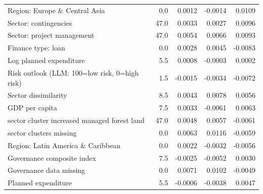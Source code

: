\begin{table}[t]
\begin{tabular}{p{6cm}rrrr}
Region: Europe \& Central Asia & 0.0 & 0.0012 & -0.0014 & 0.0109 \\[2pt]
Sector: contingencies & 47.0 & 0.0033 & 0.0027 & 0.0096 \\[2pt]
Sector: project management & 47.0 & 0.0054 & 0.0066 & 0.0093 \\[2pt]
Finance type: loan & 0.0 & 0.0028 & 0.0045 & -0.0083 \\[2pt]
Log planned expenditure & 5.5 & 0.0008 & -0.0003 & 0.0002 \\[2pt]
Risk outlook (LLM: 100=low risk, 0=high risk) & 1.5 & -0.0015 & -0.0034 & -0.0072 \\[2pt]
Sector dissimilarity & 8.5 & 0.0043 & 0.0078 & 0.0056 \\[2pt]
GDP per capita & 7.5 & 0.0033 & -0.0061 & 0.0063 \\[2pt]
sector cluster increased managed forest land & 47.0 & 0.0048 & 0.0057 & -0.0061 \\[2pt]
sector clusters missing & 0.0 & 0.0063 & 0.0116 & -0.0059 \\[2pt]
Region: Latin America \& Caribbean & 0.0 & 0.0022 & -0.0032 & -0.0056 \\[2pt]
Governance composite index & 7.5 & -0.0025 & -0.0052 & 0.0030 \\[2pt]
Governance data missing & 0.0 & 0.0071 & 0.0102 & -0.0049 \\[2pt]
Planned expenditure & 5.5 & -0.0006 & -0.0038 & 0.0047 \\[2pt]
\bottomrule
\end{tabular}
\end{table}








